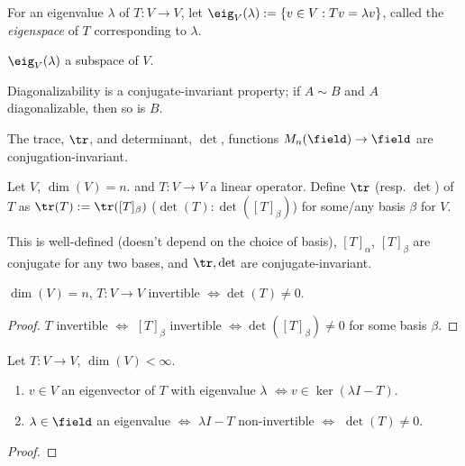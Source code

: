 \begin{definition}[Eigenspace]
    For an eigenvalue $\lambda$ of $T : V \to V$, let $\eig_V(\lambda) := \{v \in V : Tv = \lambda v\}$, called the \emph{eigenspace} of $T$ corresponding to $\lambda$.
\end{definition}

\begin{proposition}
    $\eig_V(\lambda)$ a subspace of $V$.
\end{proposition}

\begin{remark}
Diagonalizability is a conjugate-invariant property; if $A \sim B$ and $A$ diagonalizable, then so is $B$. 
\end{remark}

\begin{proposition}
    The trace, $\tr$, and determinant, $\det$, functions $M_n(\field) \to \field$ are conjugation-invariant.
\end{proposition}

\begin{definition}
    Let $V$, $\dim(V) = n$. and $T: V \to V$ a linear operator. Define $\tr$ (resp. $\det$) of $T$ as $\tr(T) := \tr([T]_\beta)$ ($\det(T) : \det([T]_\beta)$) for some/any basis $\beta$ for $V$.
\end{definition}

\begin{remark}
    This is well-defined (doesn't depend on the choice of basis), $[T]_\alpha$, $[T]_\beta$ are conjugate for any two bases, and $\tr, \det$ are conjugate-invariant.
\end{remark}

\begin{proposition}
    $\dim(V) = n$, $T : V \to V$ invertible $\iff \det(T) \neq 0$.
\end{proposition}
\begin{proof}
    $T$ invertible $\iff$ $[T]_\beta$ invertible $\iff \det([T]_\beta) \neq 0$ for some basis $\beta$.
\end{proof}

\begin{proposition}
    Let $T : V \to V$, $\dim(V) < \infty$.
    \begin{enumerate}
        \item $v \in V$ an eigenvector of $T$ with eigenvalue $\lambda$ $\iff v \in \ker(\lambda I - T)$.
        \item $\lambda \in \field$ an eigenvalue $\iff$ $\lambda I - T$ non-invertible $\iff$ $\det(T) \neq 0$.
    \end{enumerate}
\end{proposition}

\begin{proof}
    
\end{proof}